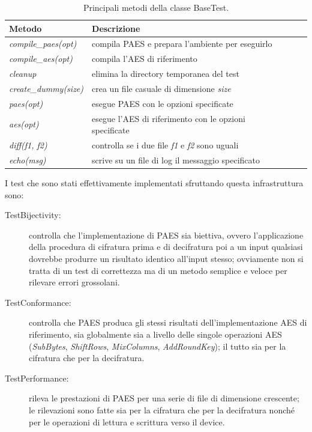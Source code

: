 \documentclass[12pt,a4paper,oneside]{book}
\begin{document}
\begin{table}[h]
\begin{center}
\begin{tabular}{|l|l|l|l|l|}
\hline
\textbf{Metodo} &  \textbf{Descrizione} \\
\hline
\textit{compile\_paes(opt)} & compila PAES e prepara l'ambiente per eseguirlo \\
\hline
\textit{compile\_aes(opt)} & compila l'\ac{AES} di riferimento \\
\hline
\textit{cleanup} & elimina la directory temporanea del test \\
\hline
\textit{create\_dummy(size)} & crea un file casuale di dimensione \textit{size} \\
\hline
\textit{paes(opt)} & esegue PAES con le opzioni specificate \\
\hline
\textit{aes(opt)} & esegue l'\ac{AES} di riferimento con le opzioni specificate \\
\hline
\textit{diff(f1, f2)} & controlla se i due file \textit{f1} e \textit{f2} sono uguali \\
\hline
\textit{echo(msg)} & scrive su un file di log il messaggio specificato \\
\hline
\end{tabular}
\caption{Principali metodi della classe BaseTest.\label{tab:paes-basetest}}
\end{center}
\end{table}

I test che sono stati effettivamente implementati sfruttando questa infrastruttura sono:
\begin{description}
\item[TestBijectivity:] controlla che l'implementazione di PAES sia biettiva, ovvero l'applicazione della procedura di cifratura prima e di decifratura poi a un input qualsiasi dovrebbe produrre un risultato identico all'input stesso; ovviamente non si tratta di un test di correttezza ma di un metodo semplice e veloce per rilevare errori grossolani.
\item[TestConformance:] controlla che PAES produca gli stessi risultati dell'implementazione \ac{AES} di riferimento, sia globalmente sia a livello delle singole operazioni \ac{AES} (\textit{SubBytes}, \textit{ShiftRows}, \textit{MixColumns}, \textit{AddRoundKey}); il tutto sia per la cifratura che per la decifratura.
\item[TestPerformance:] rileva le prestazioni di PAES per una serie di file di dimensione crescente; le rilevazioni sono fatte sia per la cifratura che per la decifratura nonché per le operazioni di lettura e scrittura verso il device.
\end{description}
\end{document}
